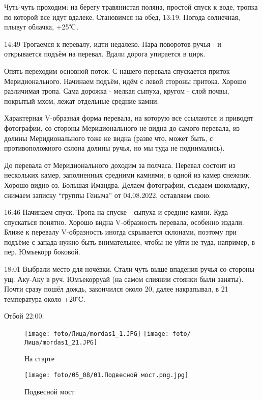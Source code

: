Чуть-чуть проходим: на берегу травянистая поляна, простой спуск к воде, тропка по которой все идут вдалеке.
Становимся на обед, 13:19. Погода солнечная, плывут облачка, +25$\tccentigrade$.

14:49 Трогаемся к перевалу, идти недалеко. Пара поворотов ручья - и открывается подъём на перевал.
Вдали дорога упирается в цирк.

Опять переходим основной поток. С нашего перевала спускается приток Меридионального. Начинаем подъём,
идём с левой стороны притока. Хорошо различимая тропа. Сама дорожка - мелкая сыпуха, кругом - слой почвы,
покрытый мхом, лежат отдельные средние камни.

Характерная V-образная форма перевала, на которую все ссылаются и приводят фотографии, со стороны Меридионального
не видна до самого перевала, из долины Меридионального тоже не видна (разве что, может быть, с противоположного
склона долины ручья, но мы туда не поднимались).

До перевала от Меридионального доходим за полчаса. Перевал состоит из нескольких камер, заполненных средними камнями;
в одной из камер снежник. Хорошо видно оз. Большая Имандра. Делаем фотографии, съедаем шоколадку,
снимаем записку ``группы Геныча'' от 04.08.2022, оставляем свою.

16:46 Начинаем спуск. Тропа на спуске - сыпуха и средние камни. Куда спускаться понятно.
Хорошо видна V-образность перевала, особенно издали. Ближе к перевалу V-образность иногда скрывается склонами,
поэтому при подъёме с запада нужно быть внимательнее, чтобы не уйти не туда, например, в пер. Юмъекорр боковой.

18:01 Выбрали место для ночёвки. Стали чуть выше впадения ручья со стороны ущ. Аку-Аку в руч. Юмъекорруай
(на самом слиянии стоянки были заняты). Почти сразу пошёл дождь, закончился около 20, далее накрапывал,
в 21 температура около +20$\tccentigrade$.

Отбой 22:00.

\begin{figure}
    \centering
    \texttt{[image: foto/Лица/mordas1\_1.JPG]}
    \texttt{[image: foto/Лица/mordas1\_21.JPG]}
    \caption{На старте}
\end{figure}

\begin{figure}
    \centering
    \texttt{[image: foto/05\_08/01.Подвесной мост.png.jpg]}
    \caption{Подвесной мост}
\end{figure}

